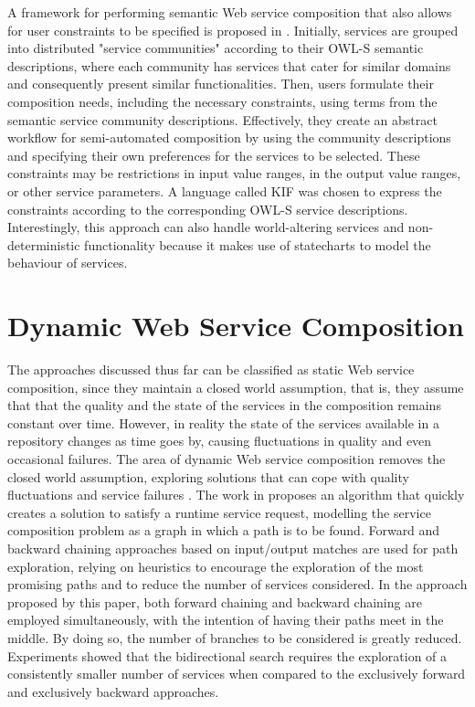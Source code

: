 A framework for performing semantic Web service composition that also allows for user constraints to be specified is proposed in \cite{gamha2008framework}. Initially, services are grouped into distributed "service communities" according to their OWL-S semantic descriptions, where each community has services that cater for similar domains and consequently present similar functionalities. Then, users formulate their composition needs, including the necessary constraints, using terms from the semantic service community descriptions. Effectively, they create an abstract workflow for semi-automated composition by using the community descriptions and specifying their own preferences for the services to be selected. These constraints may be restrictions in input value ranges, in the output value ranges, or other service parameters. A language called KIF was chosen to express the constraints according to the corresponding OWL-S service descriptions. Interestingly, this approach can also handle world-altering services and non-deterministic functionality because it makes use of statecharts to model the behaviour of services.

\section{Dynamic Web Service Composition}\label{dynamic}
The approaches discussed thus far can be classified as static Web service composition, since they maintain a closed world assumption, that is, they assume that that the quality and the state of the services in the composition remains constant over time. However, in reality the state of the services available in a repository changes as time goes by, causing fluctuations in quality and even occasional failures. The area of dynamic Web service composition removes the closed world assumption, exploring solutions that can cope with quality fluctuations and service failures \cite{alferez2013facing,berg2013revenue,DBLP:journals/soca/WenTLCLH14}. The work in \cite{khakhkhar2012dynamic} proposes an algorithm that quickly creates a solution to satisfy a runtime service request, modelling the service composition problem as a graph in which a path is to be found. Forward and backward chaining approaches based on input/output matches are used for path exploration, relying on heuristics to encourage the exploration of the most promising paths and to reduce the number of services considered. In the approach proposed by this paper, both forward chaining and backward chaining are employed simultaneously, with the intention of having their paths meet in the middle. By doing so, the number of branches to be considered is greatly reduced. Experiments showed that the bidirectional search requires the exploration of a consistently smaller number of services when compared to the exclusively forward and exclusively backward approaches.

